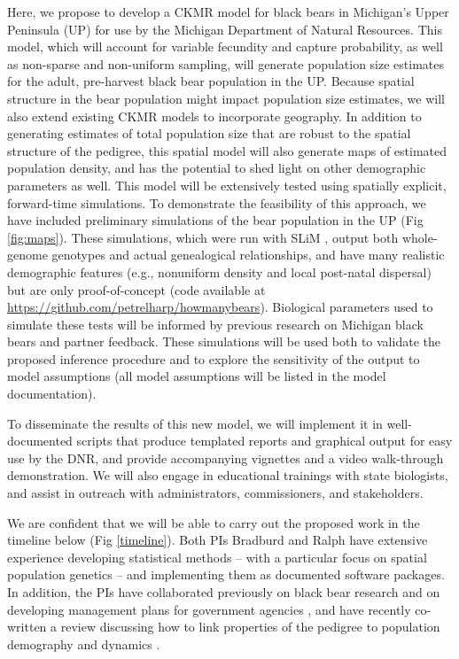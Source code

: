 \documentclass[11pt]{article}
\begin{document}
Here, we propose to develop a CKMR model 
for black bears in Michigan's Upper Peninsula (UP) 
for use by the Michigan Department of Natural Resources.
This model, which will account for 
variable fecundity and capture probability, 
as well as non-sparse and non-uniform sampling, 
will generate population size estimates 
for the adult, pre-harvest black bear population in the UP. 
Because spatial structure in the bear population might impact 
population size estimates, 
we will also extend existing CKMR models 
to incorporate geography.
In addition to generating estimates of total population size 
that are robust to the spatial structure of the pedigree, 
this spatial model will also generate maps of estimated 
population density, 
and has the potential to shed light 
on other demographic parameters as well.
This model will be extensively tested using spatially explicit,  
forward-time simulations. 
To demonstrate the feasibility of this approach, 
we have included preliminary simulations 
of the bear population in the UP (Fig \ref{fig:maps}).
These simulations, 
which were run with SLiM \citep{haller2018forward},
output both whole-genome genotypes and actual genealogical relationships,
and have many realistic demographic features 
(e.g., nonuniform density and local post-natal dispersal) 
but are only proof-of-concept
(code available at \url{https://github.com/petrelharp/howmanybears}).
Biological parameters used to simulate these tests  
will be informed by previous 
research on Michigan black bears \citep{moore2014application, mayhew2019} and partner feedback.
These simulations will be used both to 
validate the proposed inference procedure 
and to explore the sensitivity of the output to model assumptions 
(all model assumptions will be listed in the model documentation).

To disseminate the results of this new model, 
we will implement it in well-documented scripts 
that produce templated reports and graphical output
for easy use by the DNR, 
and provide accompanying vignettes 
and a video walk-through demonstration. 
We will also engage in educational trainings with state biologists, 
and assist in outreach with 
administrators, commissioners, and stakeholders.

We are confident that we will be able to 
carry out the proposed work in the timeline below (Fig \ref{timeline}).
Both PIs Bradburd and Ralph have extensive 
experience developing statistical methods \citep{bedassle, SpaceMix, bradburd2018inferring} -- 
with a particular focus on spatial population genetics \citep{bradburd2019spatial, Battey_etal_2020} -- 
and implementing them as documented software packages.
In addition, the PIs have collaborated previously 
on black bear research \citep{bradburd2018inferring}
and on developing management plans 
for government agencies \citep{shaffer2017desert}, 
and have recently co-written a review discussing how to link properties of the pedigree
to population demography and dynamics \citep{bradburd2019spatial}.
\end{document}
